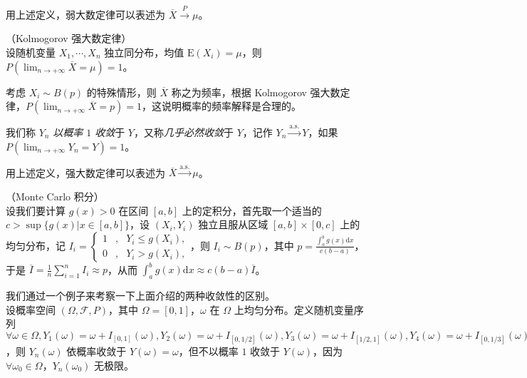 \documentclass[../main.tex]{subfiles}
\begin{document}
用上述定义，弱大数定律可以表述为 $\overline X\overset{P}{\rightarrow}\mu$。

\begin{theorem}\label{thm:5.2.2}
    （Kolmogorov 强大数定律）\\
    设随机变量 $X_1,\cdots,X_n$ 独立同分布，均值 $\mathrm E(X_i)=\mu$，则 $P(\lim_{n\rightarrow+\infty}\overline X=\mu)=1$。
\end{theorem}

考虑 $X_i\sim B(p)$ 的特殊情形，则 $\overline X$ 称之为频率，根据 Kolmogorov 强大数定律，$P(\lim_{n\rightarrow+\infty}\overline X=p)=1$，这说明概率的频率解释是合理的。

\begin{definition}\label{def:5.2.2}
    我们称 $Y_n$ \emph{以概率 $1$ 收敛}于 $Y$，又称\emph{几乎必然收敛}于 $Y$，记作 $Y_n\overset{\mathrm{a.s.}}{\rightarrow}Y$，如果 $P(\lim_{n\rightarrow+\infty}Y_n=Y)=1$。
\end{definition}

用上述定义，强大数定律可以表述为 $\overline X\overset{\mathrm{a.s.}}{\rightarrow}\mu$。

\begin{example}
    （Monte Carlo 积分）\\
    设我们要计算 $g(x)>0$ 在区间 $[a,b]$ 上的定积分，首先取一个适当的 $c>\sup\{g(x)|x\in[a,b]\}$，设 $(X_i,Y_i)$ 独立且服从区域 $[a,b]\times[0,c]$ 上的均匀分布，记 $I_i=\left\{
        \begin{aligned}
            1 & , & Y_i\leq g(X_i), \\
            0 & , & Y_i>g(X_i),
        \end{aligned}
        \right.$，则 $I_i\sim B(p)$，其中 $p=\frac{\int_a^b g(x)\mathrm{d}x}{c(b-a)}$，于是 $\overline I=\frac1n\sum_{i=1}^nI_i\approx p$，从而 $\int_a^b g(x)\mathrm{d}x\approx c(b-a)\overline I$。
\end{example}

\begin{example}
    我们通过一个例子来考察一下上面介绍的两种收敛性的区别。\\
    设概率空间 $(\Omega,\mathcal F,P)$，其中 $\Omega=[0,1]$，$\omega$ 在 $\Omega$ 上均匀分布。定义随机变量序列 $\forall\omega\in\Omega,Y_1(\omega)=\omega+I_{[0,1]}(\omega),Y_2(\omega)=\omega+I_{[0,1/2]}(\omega),Y_3(\omega)=\omega+I_{[1/2,1]}(\omega),Y_4(\omega)=\omega+I_{[0,1/3]}(\omega),Y_5(\omega)=\omega+I_{[1/3,2/3]}(\omega),Y_6(\omega)=\omega+I_{[2/3,1]}(\omega),\cdots$，则 $Y_n(\omega)$ 依概率收敛于 $Y(\omega)=\omega$，但不以概率 $1$ 收敛于 $Y(\omega)$，因为 $\forall \omega_0\in\Omega$，$Y_n(\omega_0)$ 无极限。
\end{example}
\end{document}

